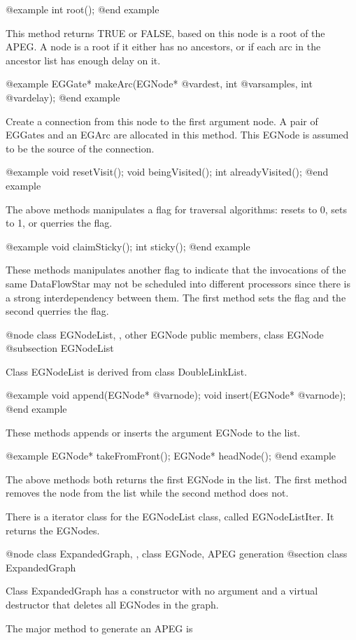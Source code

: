 @example 
int root();
@end example

This method returns TRUE or FALSE, based on this node is a root of the
APEG. A node is a root if it either has no ancestors, or if each arc
in the ancestor list has enough delay on it.

@example
EGGate* makeArc(EGNode* @var{dest}, int @var{samples}, int @var{delay});
@end example

Create a connection from this node to the first argument node. A pair of
EGGates and an EGArc are allocated in this method. This EGNode
is assumed to be the source of the connection. 

@example
void resetVisit();
void beingVisited();
int alreadyVisited();
@end example

The above methods manipulates a flag for traversal algorithms: resets to 0,
sets to 1, or querries the flag.

@example
void claimSticky();
int sticky();
@end example

These methods manipulates another flag to indicate that the invocations
of the same DataFlowStar may not be scheduled into different processors
since there is a strong interdependency between them. The first method
sets the flag and the second querries the flag.

@node class EGNodeList, , other EGNode public members, class EGNode
@subsection EGNodeList

Class EGNodeList is derived from class DoubleLinkList. 

@example
void append(EGNode* @var{node});
void insert(EGNode* @var{node});
@end example

These methods appends or inserts the argument EGNode to the list.

@example
EGNode* takeFromFront();
EGNode* headNode();
@end example

The above methods both returns the first EGNode in the list. The first method
removes the node from the list while the second method does not.

There is a iterator class for the EGNodeList class, called EGNodeListIter.
It returns the EGNodes.

@node class ExpandedGraph, , class EGNode, APEG generation
@section class ExpandedGraph

Class ExpandedGraph has a constructor with no argument and a virtual
destructor that deletes all EGNodes in the graph. 

The major method to generate an APEG is 

